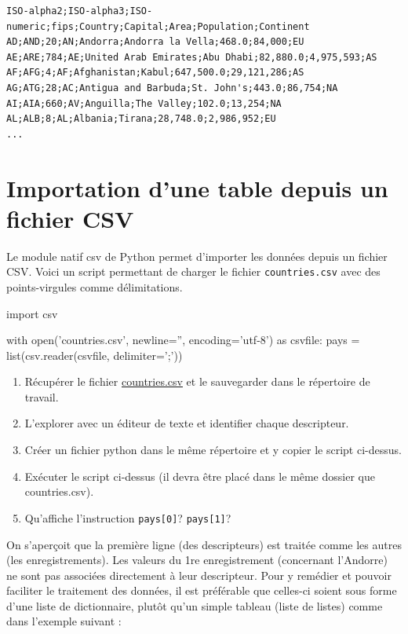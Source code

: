 \begin{lstlisting}[numbers=none]
ISO-alpha2;ISO-alpha3;ISO-numeric;fips;Country;Capital;Area;Population;Continent
AD;AND;20;AN;Andorra;Andorra la Vella;468.0;84,000;EU
AE;ARE;784;AE;United Arab Emirates;Abu Dhabi;82,880.0;4,975,593;AS
AF;AFG;4;AF;Afghanistan;Kabul;647,500.0;29,121,286;AS
AG;ATG;28;AC;Antigua and Barbuda;St. John's;443.0;86,754;NA
AI;AIA;660;AV;Anguilla;The Valley;102.0;13,254;NA
AL;ALB;8;AL;Albania;Tirana;28,748.0;2,986,952;EU
...
\end{lstlisting}

\pagebreak

\section{Importation d'une table depuis un fichier CSV}

Le module natif csv de Python permet d'importer les données depuis un fichier CSV.
Voici un script permettant de charger le fichier \verb|countries.csv| avec des points-virgules comme délimitations.


			\begin{CodePythontexAlt}[TaillePolice=\normalsize, Largeur=1\linewidth,Centre,PremLigne=1, Lignes=false,]{}
import csv

with open('countries.csv', newline='', encoding='utf-8') as csvfile:
    pays = list(csv.reader(csvfile, delimiter=';'))
\end{CodePythontexAlt}


\begin{exercice_cours}{}
\begin{enumerate}
	\item  Récupérer le fichier \href{assets/countries.csv}{countries.csv} et le sauvegarder dans le répertoire de travail.
	\item L'explorer avec un éditeur de texte et identifier chaque descripteur.
	\item Créer un fichier python dans le même répertoire et y copier le script ci-dessus.
	\item Exécuter le script ci-dessus (il devra être placé dans le même dossier que countries.csv).
	\item Qu'affiche l'instruction \texttt{pays[0]}?  \texttt{pays[1]}?
\end{enumerate}
\end{exercice_cours}

\begin{remarque}{\quad}{}
    On s'aperçoit que la première ligne (des descripteurs) est traitée comme les autres (les enregistrements).
    Les valeurs du 1re enregistrement (concernant l'Andorre) ne sont pas associées directement à leur descripteur. Pour y remédier et pouvoir faciliter le traitement des données, il est préférable que celles-ci soient sous forme d'une liste de dictionnaire, plutôt qu'un simple tableau (liste de listes) comme dans l'exemple suivant :
\end{remarque}


